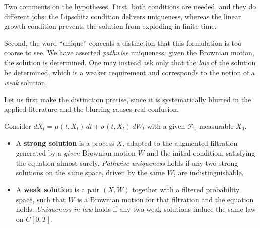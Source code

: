 \medskip


Two comments on the hypotheses. First, both conditions are needed, and they do different jobs: the Lipschitz condition delivers uniqueness, whereas the linear growth condition prevents the solution from exploding in finite time.



Second, the word ``unique'' conceals a distinction that this formulation is too coarse to see. We have asserted \emph{pathwise} uniqueness: given the Brownian motion, the solution is determined. One may instead ask only that the \emph{law} of the solution be determined, which is a weaker requirement and corresponds to the notion of a \emph{weak} solution.


Let us first make the distinction precise, since it is systematically blurred in the applied 
literature and the blurring causes real confusion.

\begin{definition}\label{def:strongweak}
Consider  $dX_t = \mu(t,X_t)\,dt + \sigma(t,X_t)\,dW_t$ with a given $\mathcal{F}_0$-measurable $X_0$.
\begin{itemize}
    \item[i)] A \textbf{strong solution} is a process $X$, adapted to the augmented filtration 
    generated by a \emph{given} Brownian motion $W$ and the initial condition, satisfying the 
    equation almost surely. \emph{Pathwise uniqueness} holds if any two strong solutions on the same 
    space, driven by the same $W$, are indistinguishable.
    \item[ii)] A \textbf{weak solution} is a pair $(X,W)$ together with a filtered probability space, 
    such that $W$ is a Brownian motion for that filtration and the equation holds. 
    \emph{Uniqueness in law} holds if any two weak solutions induce the same law on $C[0,T]$.
\end{itemize}
\end{definition}

